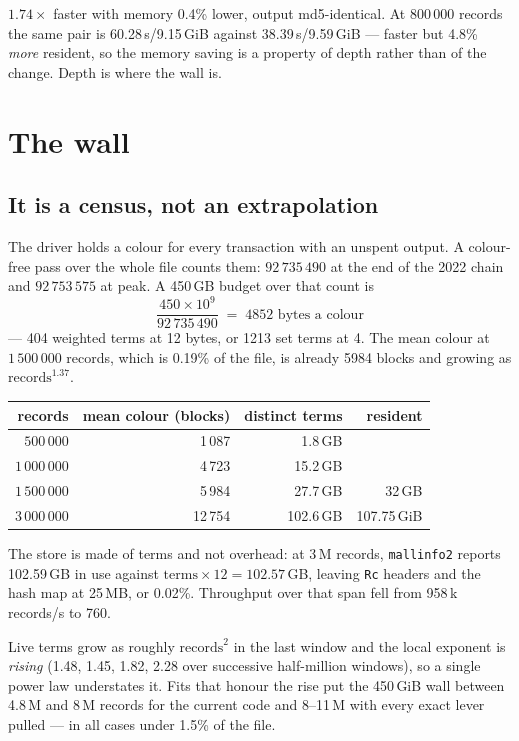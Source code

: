 \documentclass[11pt,a4paper]{article}
\begin{document}
$1.74\times$ faster with memory 0.4\% lower, output md5-identical. At 800\,000
records the same pair is 60.28\,s/9.15\,GiB against 38.39\,s/9.59\,GiB --- faster
but 4.8\% \emph{more} resident, so the memory saving is a property of depth
rather than of the change. Depth is where the wall is.

\section{The wall}
\label{sec:wall}

\subsection{It is a census, not an extrapolation}

The driver holds a colour for every transaction with an unspent output. A
colour-free pass over the whole file counts them: $92\,735\,490$ at the end of
the 2022 chain and $92\,753\,575$ at peak. A 450\,GB budget over that count is
\begin{equation*}
  \frac{450 \times 10^9}{92\,735\,490} \;=\; 4852 \text{ bytes a colour}
\end{equation*}
--- 404 weighted terms at 12 bytes, or 1213 set terms at 4. The mean colour at
$1\,500\,000$ records, which is 0.19\% of the file, is already 5984 blocks and
growing as $\text{records}^{1.37}$.

\begin{center}
\begin{tabular}{rrrr}
\toprule
records & mean colour (blocks) & distinct terms & resident \\
\midrule
$500\,000$   & 1\,087  & 1.8\,GB & \\
$1\,000\,000$ & 4\,723  & 15.2\,GB & \\
$1\,500\,000$ & 5\,984  & 27.7\,GB & 32\,GB \\
$3\,000\,000$ & 12\,754 & 102.6\,GB & 107.75\,GiB \\
\bottomrule
\end{tabular}
\end{center}

The store is made of terms and not overhead: at 3\,M records, \texttt{mallinfo2}
reports 102.59\,GB in use against $\text{terms}\times12 = 102.57$\,GB, leaving
\texttt{Rc} headers and the hash map at 25\,MB, or 0.02\%. Throughput over that
span fell from 958\,k records/s to 760.

Live terms grow as roughly $\text{records}^{2}$ in the last window and the local
exponent is \emph{rising} (1.48, 1.45, 1.82, 2.28 over successive half-million
windows), so a single power law understates it. Fits that honour the rise put
the 450\,GiB wall between 4.8\,M and 8\,M records for the current code and
8--11\,M with every exact lever pulled --- in all cases under 1.5\% of the file.
\end{document}
